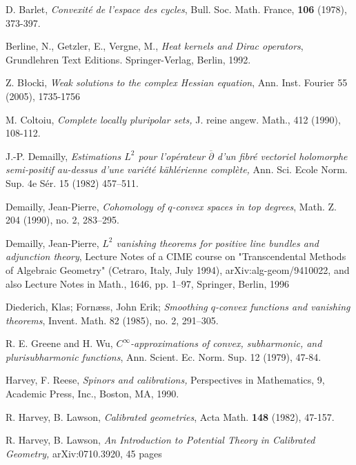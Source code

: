\documentclass[11pt]{article}
\numberwithin{equation}{section}
\newcommand{\6}{\partial}
\renewcommand{\c}[1]{{\cal #1}}
\renewcommand{\bar}{\overline}
\newcounter{theorem}[section]
\begin{document}
{\small
\begin{thebibliography}{GMP}

D. Barlet,
{\em Convexit\'e de l'espace des cycles}, 
Bull. Soc. Math. France, {\bf 106} (1978),
373-397.


Berline, N., Getzler, E., Vergne, M., {\em Heat
kernels and Dirac operators},
 Grundlehren Text Editions. Springer-Verlag,
Berlin, 1992. 

Z. B\l ocki, {\em Weak solutions to the complex Hessian equation},
Ann. Inst. Fourier 55 (2005), 1735-1756

M. Col\c toiu, {\em Complete locally pluripolar sets,} 
J. reine angew. Math., 412 (1990), 108-112.



J.-P. Demailly,
{\em Estimations $L^2$ pour l'op\'erateur $\bar\partial$ d'un fibr\'e vectoriel
holomorphe semi-positif au-dessus d'une vari\'et\'e
k\"ahl\'erienne compl\`ete,} Ann. Sci. Ecole Norm. Sup. 4e
S\'er. 15 (1982) 457--511.

Demailly, Jean-Pierre, {\em Cohomology of $q$-convex spaces in
top degrees},  Math. Z.  204  (1990),  no. 2, 283--295.

Demailly, Jean-Pierre, {\em  $L^2$ vanishing theorems for
  positive line bundles and adjunction theory},
Lecture Notes of a CIME course on "Transcendental Methods
of Algebraic Geometry" (Cetraro, Italy, July 1994),  arXiv:alg-geom/9410022,
and also Lecture Notes in Math., 1646, pp. 1--97, Springer, Berlin, 1996


Diederich, Klas; Forn\ae ss, John Erik;
{\em Smoothing $q$-convex functions and vanishing theorems},
Invent. Math. 82 (1985), no. 2, 291--305. 

R. E. Greene and H. Wu, {\em $C^\infty$-approximations of convex,
subharmonic, and plurisubharmonic functions},
Ann. Scient. Ec. Norm. Sup. 12 (1979), 47-84.

Harvey, F. Reese, {\em Spinors and calibrations,} Perspectives in 
Mathematics, 9, Academic Press, Inc., Boston, MA, 1990.


R. Harvey, B. Lawson, 
{\em Calibrated geometries},  Acta Math. {\bf 148} (1982), 47-157.

R. Harvey, B. Lawson, 
{\em  An Introduction to Potential Theory in Calibrated
  Geometry,} arXiv:0710.3920, 45 pages


\end{thebibliography}}
\end{document}
